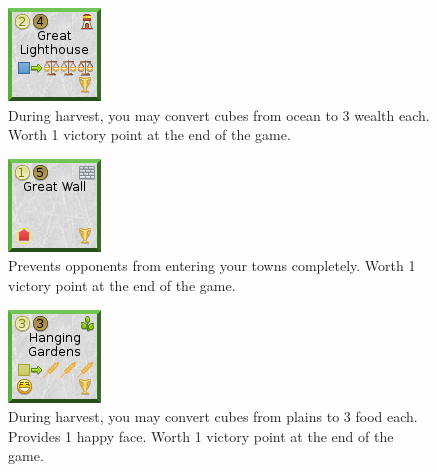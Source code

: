 \documentclass[11pt,a4paper,titlepage]{article}
\begin{document}
{  \begin{figure}[!htb]
    \begin{minipage}[c]{0.1\textwidth}
      \includegraphics[scale=.7]{doe_wonder_great_lighthouse.png}
    \end{minipage}\hfill
    \begin{minipage}[c]{0.6\textwidth}
      \captionsetup{labelformat=empty, justification=justified, singlelinecheck=false}
      \caption{During harvest, you may convert cubes from ocean to 3 wealth each. Worth 1 victory point at the end of the game.}
    \end{minipage}\hfill
    \label{fig:wonder_great_lighthouse}
  \end{figure}

  \begin{figure}[!htb]
    \begin{minipage}[c]{0.1\textwidth}
      \includegraphics[scale=.7]{doe_wonder_great_wall.png}
    \end{minipage}\hfill
    \begin{minipage}[c]{0.6\textwidth}
      \captionsetup{labelformat=empty, justification=justified, singlelinecheck=false}
      \caption{Prevents opponents from entering your towns completely. Worth 1 victory point at the end of the game.}
    \end{minipage}\hfill
    \label{fig:wonder_great_wall}
  \end{figure}

  \begin{figure}[!htb]
    \begin{minipage}[c]{0.1\textwidth}
      \includegraphics[scale=.7]{doe_wonder_hanging_gardens.png}
    \end{minipage}\hfill
    \begin{minipage}[c]{0.6\textwidth}
      \captionsetup{labelformat=empty, justification=justified, singlelinecheck=false}
      \caption{During harvest, you may convert cubes from plains to 3 food each. Provides 1 happy face. Worth 1 victory point at the end of the game.}
    \end{minipage}\hfill
    \label{fig:wonder_hanging_gardens}
  \end{figure}

}
\end{document}
